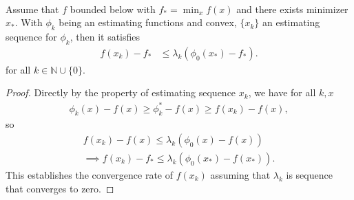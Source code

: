 \documentclass[12pt]{article}
\begin{document}
        \begin{lemma}
            \;\\
            Assume that $f$ bounded below with $f_* = \min_x f(x)$ and there exists minimizer $x_*$. 
            With $\phi_k$ being an estimating functions and convex, $\{x_k\}$ an estimating sequence for $\phi_k$, then it satisfies
            \begin{align*}
                f(x_k) - f_*
                &\le 
                \lambda_k(\phi_0(x_*) - f_*). 
            \end{align*}
            for all $k\in \mathbb N\cup \{0\}$. 
        \end{lemma}
        \begin{proof}
            Directly by the property of estimating sequence $x_k$, we have for all $k, x$
            \begin{align*}
                \phi_k(x) - f(x) \ge \phi_k^* - f(x) \ge f(x_k) - f(x), 
            \end{align*}
            so 
            \begin{align*}
                f(x_k) - f(x) \le \lambda_k (\phi_0(x) - f(x))
                \\
                \implies 
                f(x_k) - f_* \le \lambda_k (\phi_0(x_*) - f(x_*)). 
            \end{align*}
            This establishes the convergence rate of $f(x_k)$ assuming that $\lambda_k$ is sequence that converges to zero. 
        \end{proof}
\end{document}
